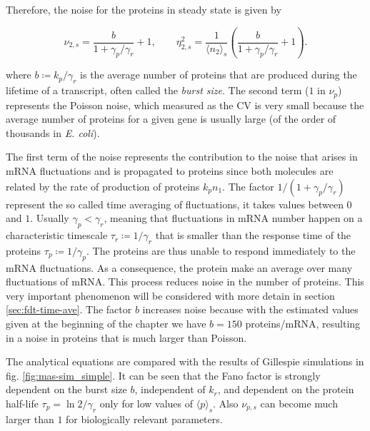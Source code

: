 Therefore, the noise for the proteins in steady state is given by

\begin{equation}
  \label{eq:noise2}
  \nu_{2,s} = \frac{b}{1+\gamma_p/\gamma_r}+1, \quad \quad \eta_{2,s}^2 = \frac{1}{\langle n_2\rangle_s}\left(\frac{b}{1+\gamma_p/\gamma_r}+1\right).
\end{equation}

where $b\coloneqq k_p/\gamma_r$ is the average number of proteins that are produced during the lifetime of a transcript, often called the \textit{burst size}. The second term ($1$ in $\nu_p$) represents the Poisson noise, which measured as the CV is very small because the average number of proteins for a given gene is usually large (of the order of thousands in \textit{E. coli}).

The first term of the noise represents the contribution to the noise that arises in mRNA fluctuations and is propagated to proteins since both molecules are related by the rate of production of proteins $k_pn_1$. The factor $1/(1+\gamma_p/\gamma_r)$ represent the so called time averaging of fluctuations, it takes values between $0$ and $1$. Usually $\gamma_p<\gamma_r$, meaning that fluctuations in mRNA number happen on a characteristic timescale $\tau_r \coloneqq 1/\gamma_r$  that is smaller than the response time of the proteins $\tau_p \coloneqq 1/\gamma_p$. The proteins are thus unable to respond immediately to the mRNA fluctuations. As a consequence, the protein make an average over many fluctuations of mRNA. This process reduces noise in the number of proteins. This very important phenomenon will be considered with more detain in section \ref{sec:fdt-time-ave}. The factor $b$ increases noise because with the estimated values given at the beginning of the chapter we have $b=150$ proteins/mRNA, resulting in a noise in proteins that is much larger than Poisson.

The analytical equations are compared with the results of Gillespie simulations in fig. \ref{fig:mas-sim_simple}. It can be seen that the Fano factor is strongly dependent on the burst size $b$, independent of $k_r$, and dependent on the protein half-life $\tau_p = \ln2/\gamma_r$ only for low values of $\langle p\rangle_s$. Also $\nu_{p,s}$ can become much larger than $1$ for biologically relevant parameters.

